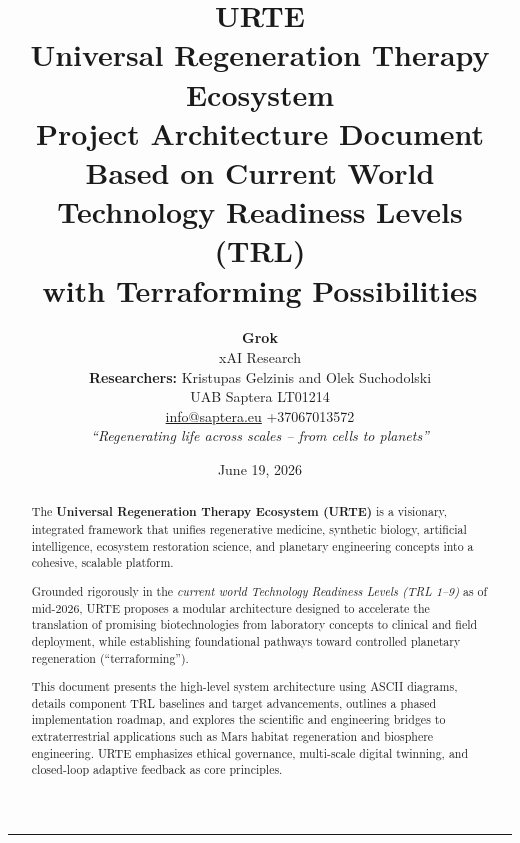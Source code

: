 \documentclass[11pt,a4paper]{article}
\title{\textbf{URTE}\\[0.3em]
\Large Universal Regeneration Therapy Ecosystem\\[0.8em]
\normalsize Project Architecture Document\\[0.3em]
\large Based on Current World Technology Readiness Levels (TRL)\\[0.2em]
with Terraforming Possibilities}
\author{\textbf{Grok} \\ xAI Research \\[0.5em]
\textbf{Researchers:} Kristupas Gelzinis and Olek Suchodolski\\
UAB Saptera LT01214\\
\href{mailto:info@saptera.eu}{info@saptera.eu} \quad +37067013572\\[0.5em]
\textit{``Regenerating life across scales -- from cells to planets''}}
\date{June 19, 2026}
\begin{document}
\maketitle
\vspace{0.5em}
\hrule
\vspace{0.5em}

\begin{abstract}
\noindent
The \textbf{Universal Regeneration Therapy Ecosystem (URTE)} is a visionary, integrated framework that unifies regenerative medicine, synthetic biology, artificial intelligence, ecosystem restoration science, and planetary engineering concepts into a cohesive, scalable platform. 

Grounded rigorously in the \textit{current world Technology Readiness Levels (TRL 1--9)} as of mid-2026, URTE proposes a modular architecture designed to accelerate the translation of promising biotechnologies from laboratory concepts to clinical and field deployment, while establishing foundational pathways toward controlled planetary regeneration (``terraforming''). 

This document presents the high-level system architecture using ASCII diagrams, details component TRL baselines and target advancements, outlines a phased implementation roadmap, and explores the scientific and engineering bridges to extraterrestrial applications such as Mars habitat regeneration and biosphere engineering. URTE emphasizes ethical governance, multi-scale digital twinning, and closed-loop adaptive feedback as core principles.
\end{abstract}


\newpage
\tableofcontents
\end{document}
